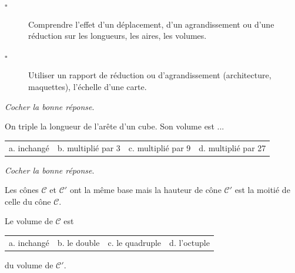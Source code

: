 \documentclass[openany]{book}
\begin{document}
\begin{seance}

\begin{description}
\item[$\square$] Comprendre l’effet d’un déplacement, d’un agrandissement ou d’une réduction sur les longueurs, les aires, les volumes.
\item[$\square$] Utiliser un rapport de réduction ou d’agrandissement (architecture, maquettes), l’échelle d’une carte.
\end{description}
\end{seance}



\Exe

\emph{Cocher la bonne réponse}.

On triple la longueur de l’arête d’un cube. Son volume est ...

\begin{tabular}{cccc}

a. inchangé & b. multiplié par 3 & c. multiplié par 9 & d. multiplié par 27 \\ 

\end{tabular} 


\Exe

\emph{Cocher la bonne réponse}.

Les cônes $\mathscr{C}$ et $\mathscr{C'}$ ont la même base mais la hauteur de cône $\mathscr{C'}$ est la moitié de celle du cône $\mathscr{C}$.

Le volume de $\mathscr{C}$ est

\begin{tabular}{cccc}

a. inchangé & b. le double & c. le quadruple & d. l'octuple 

\end{tabular} 

du volume de $\mathscr{C'}$.
 
\Dnb
\end{document}

